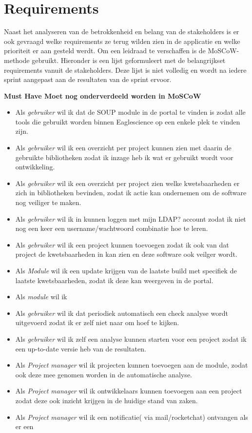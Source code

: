 \section{Requirements}\label{sec:requirements}
Naast het analyseren van de betrokkenheid en belang van de stakeholders is er ook gevraagd welke requirements ze terug wilden zien in de applicatie en welke prioriteit er aan gesteld werdt.
Om een leidraad te verschaffen is de MoSCoW-methode gebruikt.
Hieronder is een lijst geformuleert met de belangrijkset requirements vanuit de stakeholders.
Deze lijst is niet volledig en wordt na iedere sprint aangepast aan de resultaten van de sprint ervoor.

\textbf{Must Have Moet nog onderverdeeld worden in MoSCoW}
\begin{itemize}
  \item Als \textit{gebruiker} wil ik dat de SOUP module in de portal te vinden is zodat alle tools die gebruikt worden binnen Eaglescience op een enkele plek te vinden zijn.
  \item Als \textit{gebruiker} wil ik een overzicht per project kunnen zien met daarin de gebruikte bibliotheken zodat ik inzage heb ik wat er gebruikt wordt voor ontwikkeling.
  \item Als \textit{gebruiker} wil ik een overzicht per project zien welke kwetsbaarheden er zich in bibliotheken bevinden, zodat ik actie kan ondernemen om de software nog veiliger te maken.
  \item Als \textit{gebruiker} wil ik in kunnen loggen met mijn LDAP? account zodat ik niet nog een keer een username/wachtwoord combinatie hoe te leren.
  \item Als \textit{gebruiker} wil ik een project kunnen toevoegen zodat ik ook van dat project de kwetsbaarheden in kan zien en deze software ook veilger wordt.
  \item Als \textit{Module} wil ik een update krijgen van de laatste build met specifiek de laatste kwetsbaarheden, zodat ik deze kan weergeven in de portal.
  \item Als \textit{module} wil ik
  \item Als \textit{gebruiker} wil ik dat periodiek automatisch een check analyse wordt uitgevoerd zodat ik er zelf niet naar om hoef te kijken.
  \item Als \textit{gebruiker} wil ik zelf een analyse kunnen starten voor een project zodat ik een up-to-date versie heb van de resultaten.
  \item Als \textit{Project manager} wil ik projecten kunnen toevoegen aan de module, zodat ook deze mee genomen worden in de automatische analyse.
  \item Als \textit{Project manager} wil ik ontwikkelaars kunnen toevoegen aan een project zodat deze ook inzicht krijgen in de huidige stand van zaken.
  \item Als \textit{Project manager} wil ik een notificatie( via mail/rocketchat) ontvangen als er een
\end{itemize}

